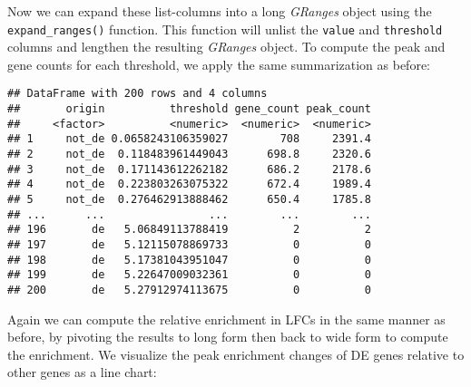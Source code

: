 \documentclass[
]{article}
\newenvironment{Shaded}{}{}
\newcommand{\DataTypeTok}[1]{\textcolor[rgb]{0.56,0.13,0.00}{#1}}
\newcommand{\DecValTok}[1]{\textcolor[rgb]{0.25,0.63,0.44}{#1}}
\newcommand{\KeywordTok}[1]{\textcolor[rgb]{0.00,0.44,0.13}{\textbf{#1}}}
\newcommand{\NormalTok}[1]{#1}
\newcommand{\OperatorTok}[1]{\textcolor[rgb]{0.40,0.40,0.40}{#1}}
\newcommand{\StringTok}[1]{\textcolor[rgb]{0.25,0.44,0.63}{#1}}
\begin{document}
Now we can expand these list-columns into a long \emph{GRanges} object using the
\texttt{expand\_ranges()} function. This function will unlist the \texttt{value} and
\texttt{threshold} columns and lengthen the resulting \emph{GRanges} object. To compute
the peak and gene counts for each threshold, we apply the same summarization as
before:

\begin{Shaded}
\end{Shaded}

\begin{verbatim}
## DataFrame with 200 rows and 4 columns
##       origin          threshold gene_count peak_count
##     <factor>          <numeric>  <numeric>  <numeric>
## 1     not_de 0.0658243106359027        708     2391.4
## 2     not_de  0.118483961449043      698.8     2320.6
## 3     not_de  0.171143612262182      686.2     2178.6
## 4     not_de  0.223803263075322      672.4     1989.4
## 5     not_de  0.276462913888462      650.4     1785.8
## ...      ...                ...        ...        ...
## 196       de   5.06849113788419          2          2
## 197       de   5.12115078869733          0          0
## 198       de   5.17381043951047          0          0
## 199       de   5.22647009032361          0          0
## 200       de   5.27912974113675          0          0
\end{verbatim}

Again we can compute the relative enrichment in LFCs in the same manner as
before, by pivoting the results to long form then back to wide form to compute
the enrichment. We visualize the peak enrichment changes of DE genes
relative to other genes as a line chart:
\end{document}
